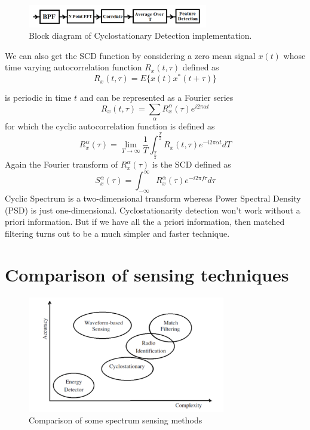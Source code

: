 \begin{figure}
\centering
\includegraphics[width=0.7\textwidth]{csd}
\caption[Cyclostationary Detection implementation]{Block diagram 
of Cyclostationary Detection implementation.}
\label{csd}
\end{figure}

We can also get the SCD function by considering a zero mean signal $x(t)$
whose time varying autocorrelation function $R_x(t,\tau)$ defined as
\cite{prithvi11}
\begin{equation*}
    R_{x}(t,\tau) = E\{x(t)x^{\ast}(t+\tau)\}
\end{equation*}

is periodic in time $t$ and can be represented as a Fourier series
\begin{equation*}
    R_{x}(t,\tau) = \sum_{\alpha}R_{x}^{\alpha} (\tau)e^{i2\pi\alpha t} 
\end{equation*}
for which the cyclic autocorrelation function is defined as
\begin{equation*}
    R_{x}^{\alpha}(\tau) = \lim_{T\rightarrow\infty} {\frac{1}{T}}
    \int_{\frac{T}{2}}^{\frac{T}{2}}R_{x}(t,\tau)e^{-i2\pi\alpha t}dT
\end{equation*}
Again the Fourier transform of $R_{x}^{\alpha}(\tau)$ is the SCD defined as
\begin{equation*}
    S_{x}^{\alpha}(\tau)=\int_{-\infty}^{\infty}R_{x}^{\alpha}
    (\tau)e^{-i2\pi f\tau}d\tau
\end{equation*}
Cyclic Spectrum is a two-dimensional transform whereas Power Spectral Density
(PSD) is just one-dimensional. Cyclostationarity detection won't work without
a priori information. But if we have all the a priori information, then 
matched filtering turns out to be a much simpler and faster technique.

\section{Comparison of sensing techniques}

\begin{figure}
\centering
\includegraphics[width=0.77\textwidth]{compareSensing}
\caption[Comparison of sensing methods]{Comparison of some spectrum sensing 
methods}
\label{compareSensing}
\end{figure}

